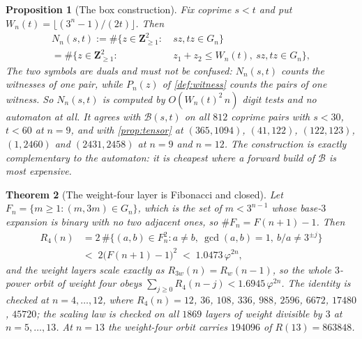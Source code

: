 \documentclass[11pt]{amsart}
\newtheorem{theorem}{Theorem}[section]
\newtheorem{proposition}[theorem]{Proposition}
\theoremstyle{definition}
\theoremstyle{remark}
\begin{document}
\begin{proposition}[The box construction]
\label{prop:box}
Fix coprime $s<t$ and put $W_n(t)=\lfloor (3^n-1)/(2t)\rfloor$. Then
\[
\begin{aligned}
N_n(s,t):=\#\{z\in\mathbf{Z}_{\ge 1}^2:\ &sz,tz\in G_n\}\\
=\#\{z\in\mathbf{Z}_{\ge 1}^2:\ &z_1+z_2\le W_n(t),\ sz,tz\in G_n\},
\end{aligned}
\]
The two symbols are duals and must not be confused: $N_n(s,t)$ counts the witnesses of one pair, while $P_n(z)$ of \cref{def:witness} counts the pairs of one witness. So $N_n(s,t)$ is computed by $O(W_n(t)^2\,n)$ digit tests and no automaton at all. It agrees with $\mathcal{B}(s,t)$ on all $812$ coprime pairs with $s<30$, $t<60$ at $n=9$, and with \cref{prop:tensor} at $(365,1094)$, $(41,122)$, $(122,123)$, $(1,2460)$ and $(2431,2458)$ at $n=9$ and $n=12$. The construction is exactly complementary to the automaton: it is cheapest where a forward build of $\mathcal{B}$ is most expensive.
\end{proposition}

\begin{theorem}[The weight-four layer is Fibonacci and closed]
\label{thm:weightfour}
Let $F_n=\{m\ge 1:(m,3m)\in G_n\}$, which is the set of $m<3^{n-1}$ whose base-$3$ expansion is binary with no two adjacent ones, so $\#F_n=F(n+1)-1$. Then
\[
\begin{aligned}
R_4(n)&=2\,\#\{(a,b)\in F_n^2: a\neq b,\ \gcd(a,b)=1,\ b/a\neq 3^{\pm j}\}\\
&<\;2\bigl(F(n+1)-1\bigr)^2\;<\;1.0473\,\varphi^{2n},
\end{aligned}
\]
and the weight layers scale exactly as $R_{3w}(n)=R_w(n-1)$, so the whole $3$-power orbit of weight four obeys $\sum_{j\ge 0}R_4(n-j)<1.6945\,\varphi^{2n}$. The identity is checked at $n=4,\dots,12$, where $R_4(n)=12$, $36$, $108$, $336$, $988$, $2596$, $6672$, $17480$, $45720$; the scaling law is checked on all $1869$ layers of weight divisible by $3$ at $n=5,\dots,13$. At $n=13$ the weight-four orbit carries $194096$ of $R(13)=863848$.
\end{theorem}
\end{document}
